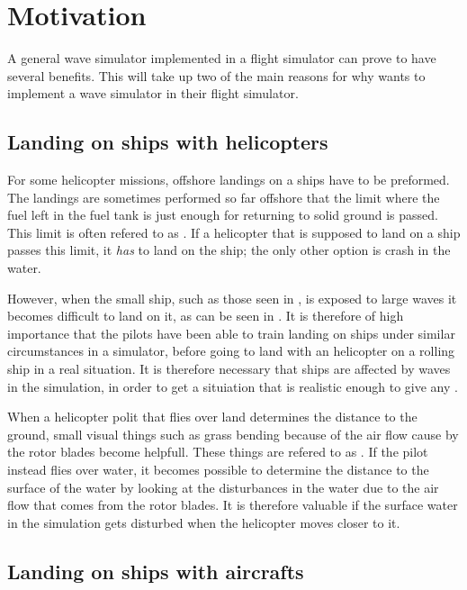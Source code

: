 \chapter{Motivation}

A general wave simulator implemented in a flight simulator can prove to have several benefits. This \levelname will take up two of the main reasons for why \Saab wants to implement a wave simulator in their flight simulator.

\section{Landing on ships with helicopters}

For some helicopter missions, offshore landings on a ships have to be preformed. The landings are sometimes performed so far offshore that the limit where the fuel left in the fuel tank is just enough for returning to solid ground is passed. This limit is often refered to as . If a helicopter that is supposed to land on a ship passes this limit, it \emph{has} to land on the ship; the only other option is crash in the water.

However, when the small ship, such as those seen in \citep{MrOawal2009,PrismDefence2010}, is exposed to large waves it becomes difficult to land on it, as can be seen in \citep{PrismDefence2010}. It is therefore of high importance that the pilots have been able to train landing on ships under similar circumstances in a simulator, before going to land with an helicopter on a rolling ship in a real situation. It is therefore necessary that ships are affected by waves in the simulation, in order to get a situiation that is realistic enough to give any .

When a helicopter polit that flies over land determines the distance to the ground, small visual things such as grass bending because of the air flow cause by the rotor blades become helpfull. These things are refered to as . If the pilot instead flies over water, it becomes possible to determine the distance to the surface of the water by looking at the disturbances in the water due to the air flow that comes from the rotor blades. It is therefore valuable if the surface water in the simulation gets disturbed when the helicopter moves closer to it.

\section{Landing on ships with aircrafts}

